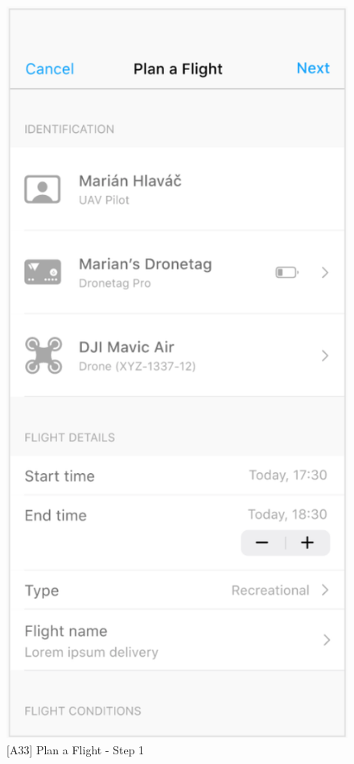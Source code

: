 \begin{figure}
    \centering
    \begin{minipage}{.45\textwidth}
        \centering
        \includegraphics[width=.7\linewidth]{assets/user_interface_design/flight/plan_a_flight_step_1.png}
        \caption{[A33] Plan a Flight - Step 1}
        \label{fig:plan_a_flight_1}
    \end{minipage}%
    \hspace{.05\linewidth}
    \begin{minipage}{.45\textwidth}
        \centering

\end{minipage}
\end{figure}
